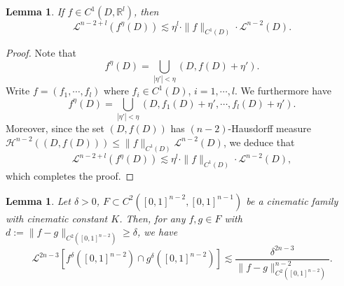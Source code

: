 \documentclass[11pt,a4paper,reqno]{amsart}
\newcommand{\R}{\mathbb{R}}
\newcommand{\calL}{\mathcal{L}}
\newcommand{\calH}{\mathcal{H}}
\newcommand{\1}{\mathbf{1}}
\numberwithin{equation}{section}
\theoremstyle{plain}
\newtheorem{lemma}[equation]{Lemma}
\theoremstyle{definition}
\theoremstyle{remark}
\begin{document}
\begin{lemma}\label{nbhd}
  If $f \in C^1(D , \R^l)$, then
   $$\calL^{n-2+l}(f^{\eta}(D)) \lesssim \eta^{l}\cdot \|f\|_{C^1(D)}\cdot  \calL^{n-2}(D).$$
\end{lemma}
\begin{proof}
  Note that
  $$ f^{\eta}(D) = \bigcup_{|\eta'|<\eta} (D,f(D)+\eta'). $$
 Write $f=(f_1, \cdots, f_l)$ where $f_i \in C^1(D)$, $i=1,\cdots,l$.
 We furthermore have
 $$ f^{\eta}(D) = \bigcup_{|\eta'|<\eta} (D,f_1(D)+\eta', \cdots, f_l(D)+\eta'). $$
  Moreover, since the set $(D,f(D))$ has $(n-2)$-Hausdorff measure $\calH^{n-2}((D,f(D))) \le \|f\|_{C^1(D)}\calL^{n-2}(D)$, we deduce that
  $$ \calL^{n-2+l}(f^{\eta}(D)) \lesssim \eta^{l}\cdot \|f\|_{C^1(D)}\cdot  \calL^{n-2}(D), $$
  which completes the proof.
\end{proof}


\begin{lemma} \label{fg}
Let $\delta>0$,
$F \subset C^{2}([0,1]^{n-2},[0,1]^{n-1})$ be a cinematic family with cinematic constant $K$. Then, for any $f,g \in F$ with $d:=\|f-g\|_{C^2([0,1]^{n-2})} \ge \delta$, we have
\begin{equation}\label{meas}
  \calL^{2n-3}[f^{\delta}([0,1]^{n-2})\cap g^{\delta}([0,1]^{n-2})] \lesssim \frac{\delta^{2n-3}}{\|f-g\|_{C^2([0,1]^{n-2})}^{n-2}}.
\end{equation}
\end{lemma}
\end{document}
